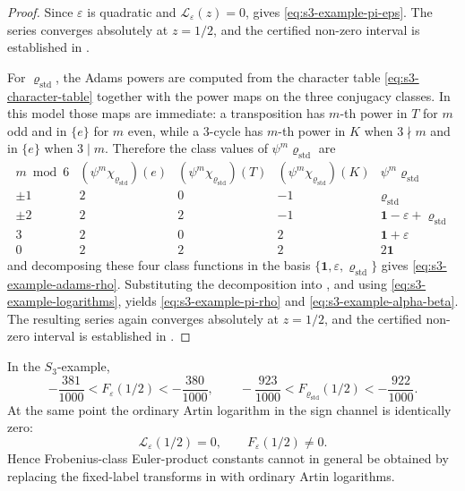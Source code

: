 \begin{proof}
  Since \(\varepsilon\) is quadratic and
  \(\mathcal L_\varepsilon(z)=0\), 
  gives \eqref{eq:s3-example-pi-eps}. The series converges absolutely
  at \(z=1/2\), and the certified non-zero interval is established in
  .

  For \(\varrho_{\mathrm{std}}\), the Adams powers are computed from the character table
  \eqref{eq:s3-character-table} together with the power maps on the
  three conjugacy classes. In this model those maps are immediate: a
  transposition has \(m\)-th power in \(T\) for \(m\) odd and in
  \(\{e\}\) for \(m\) even, while a \(3\)-cycle has \(m\)-th power in
  \(K\) when \(3\nmid m\) and in \(\{e\}\) when \(3\mid m\). Therefore
  the class values of \(\psi^m\varrho_{\mathrm{std}}\) are
  \[
    \begin{array}{c|ccc|c}
      m \bmod 6
      & (\psi^m\chi_{\varrho_{\mathrm{std}}})(e)
      & (\psi^m\chi_{\varrho_{\mathrm{std}}})(T)
      & (\psi^m\chi_{\varrho_{\mathrm{std}}})(K)
      & \psi^m\varrho_{\mathrm{std}} \\ \hline
      \pm 1 & 2 & 0 & -1 & \varrho_{\mathrm{std}} \\
      \pm 2 & 2 & 2 & -1 & \mathbf 1-\varepsilon+\varrho_{\mathrm{std}} \\
      3 & 2 & 0 & 2 & \mathbf 1+\varepsilon \\
      0 & 2 & 2 & 2 & 2\mathbf 1
    \end{array}
  \]
  and decomposing these four class functions in the basis
  \(\{\mathbf 1,\varepsilon,\varrho_{\mathrm{std}}\}\) gives
  \eqref{eq:s3-example-adams-rho}. Substituting the decomposition into
  , and using
  \eqref{eq:s3-example-logarithms}, yields
  \eqref{eq:s3-example-pi-rho} and \eqref{eq:s3-example-alpha-beta}.
  The resulting series again converges absolutely at \(z=1/2\), and the
  certified non-zero interval is established in
  .
\end{proof}

\begin{proposition}
  \label{prop:s3-naive-artin-obstruction}
  In the \(S_3\)-example,
  \begin{equation}\label{eq:s3-f-level-windows}
    -\frac{381}{1000}<F_\varepsilon(1/2)<-\frac{380}{1000},
    \qquad
    -\frac{923}{1000}<F_{\varrho_{\mathrm{std}}}(1/2)<-\frac{922}{1000}.
  \end{equation}
  At the same point the ordinary Artin logarithm in the sign channel is
  identically zero:
  \begin{equation}\label{eq:s3-artin-zero-f-nonzero}
    \mathcal L_\varepsilon(1/2)=0,
    \qquad
    F_\varepsilon(1/2)\neq0.
  \end{equation}
  Hence Frobenius-class Euler-product constants cannot in general be
  obtained by replacing the fixed-label transforms in
   with ordinary Artin logarithms.
\end{proposition}

